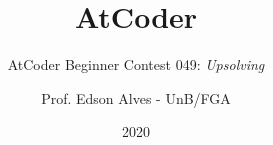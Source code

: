 \title{AtCoder}
\subtitle{AtCoder Beginner Contest 049: {\it Upsolving}}
\author{Prof. Edson Alves - UnB/FGA}
\date{2020}
